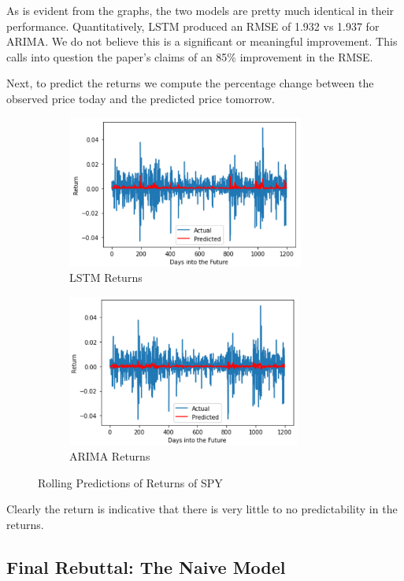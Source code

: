 \documentclass{article}
\begin{document}
As is evident from the graphs, the two models are pretty much identical in their performance. Quantitatively, LSTM produced an RMSE of 1.932 vs 1.937 for ARIMA. We do not believe this is a significant or meaningful improvement. This calls into question the paper's claims of an 85\% improvement in the RMSE.

Next, to predict the returns we compute the percentage change between the observed price today and the predicted price tomorrow.

\begin{figure}[h]

\begin{subfigure}{0.5\textwidth}
\includegraphics[width=0.9\linewidth, height=5cm]{LSTM Returns.PNG} 
\caption{LSTM Returns}
\label{fig:subim1}
\end{subfigure}
\begin{subfigure}{0.5\textwidth}
\includegraphics[width=0.9\linewidth, height=5cm]{ARIMA Returns.PNG}
\caption{ARIMA Returns}
\label{fig:subim2}
\end{subfigure}

\caption{Rolling Predictions of Returns of SPY}
\label{fig:image2}
\end{figure}

Clearly the return is indicative that there is very little to no predictability in the returns. 

\subsection{Final Rebuttal: The Naive Model}
\end{document}

